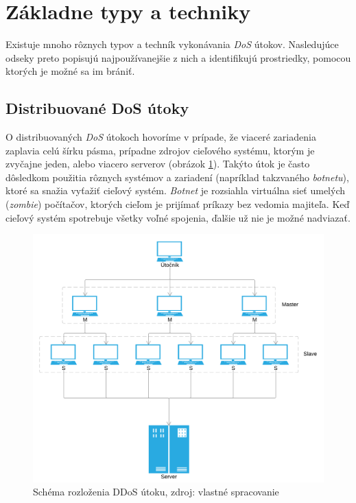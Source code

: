 \documentclass[
  digital, %
  table,   %
  lof,     %
  nolot,   %
  nocover
]{fithesis3}
\begin{document}
\section{Základne typy a techniky}
Existuje mnoho rôznych typov a techník vykonávania \textit{DoS} útokov.
Nasledujúce odseky preto popisujú najpoužívanejšie z nich a identifikujú
prostriedky, pomocou ktorých je možné sa im brániť.

\subsection{Distribuované DoS útoky}
O distribuovaných \textit{DoS} útokoch hovoríme v prípade, že viaceré zariadenia zaplavia
celú šírku pásma, prípadne zdrojov cieľového systému, ktorým je zvyčajne jeden, alebo viacero
serverov (obrázok \ref{fig:ddos}). Takýto útok je často dôsledkom použitia rôznych systémov a zariadení (napríklad
takzvaného \textit{botnetu}), ktoré sa snažia vyťažiť cieľový systém. \textit{Botnet} je rozsiahla
virtuálna sieť umelých (\textit{zombie}) počítačov, ktorých cieľom je prijímať príkazy bez
vedomia majiteľa. Keď cieľový systém spotrebuje všetky voľné spojenia, ďalšie už nie
je možné nadviazať. 

\begin{figure}[h]
  \centering
    \includegraphics[width=\textwidth]{images/ddos.png}
  \caption{Schéma rozloženia DDoS útoku, zdroj: vlastné spracovanie}
  \label{fig:ddos}
\end{figure}
\end{document}

